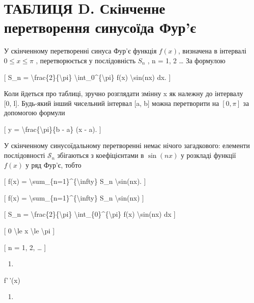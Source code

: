 \documentclass[
]{article}
\providecommand{\tightlist}{%
  \setlength{\itemsep}{0pt}\setlength{\parskip}{0pt}}
\begin{document}
\section{ТАБЛИЦЯ D. Скінченне перетворення синусоїда
Фур'є}\label{ux442ux430ux431ux43bux438ux446ux44f-d.-ux441ux43aux456ux43dux447ux435ux43dux43dux435-ux43fux435ux440ux435ux442ux432ux43eux440ux435ux43dux43dux44f-ux441ux438ux43dux443ux441ux43eux457ux434ux430-ux444ux443ux440ux454}

У скінченному перетворенні синуса Фур'є функція \(f(x)\), визначена в
інтервалі \(0 \le x \le \pi\) , перетворюється у послідовність \(S_n\) ,
n = 1, 2 \ldots{} За формулою

{[} S\_n = \textbackslash frac\{2\}\{\textbackslash pi\}
\textbackslash int\_0\^{}\{\textbackslash pi\} f(x)
\textbackslash sin(nx) dx. {]}

Коли йдеться про таблиці, зручно розглядати змінну x як належну до
інтервалу {[}0, l{]}. Будь-який інший чисельний інтервал {[}a, b{]}
можна перетворити на \([0, \pi]\) за допомогою формули

{[} y = \textbackslash frac\{\textbackslash pi\}\{b - a\} (x - a). {]}

У скінченному синусоїдальному перетворенні немає нічого загадкового:
елементи послідовності \(\mathcal{S}_n\) збігаються з коефіцієнтами в
\(\sin(nx)\) у розкладі функції \(f(x)\) у ряд Фур'є, тобто

{[} f(x) = \textbackslash sum\_\{n=1\}\^{}\{\textbackslash infty\} S\_n
\textbackslash sin(nx). {]}

{[} f(x) = \textbackslash sum\_\{n=1\}\^{}\{\textbackslash infty\} S\_n
\textbackslash sin(nx) {]}

{[} S\_n = \textbackslash frac\{2\}\{\textbackslash pi\}
\textbackslash int\_\{0\}\^{}\{\textbackslash pi\} f(x)
\textbackslash sin(nx) dx {]}

{[} 0 \textbackslash le x \textbackslash le \textbackslash pi {]}

{[} n = 1, 2, \ldots{} {]}

\begin{enumerate}
\def\labelenumi{\arabic{enumi}.}
\tightlist
\item
\end{enumerate}

f'\,'(x)

\begin{enumerate}
\def\labelenumi{\arabic{enumi}.}
\setcounter{enumi}{8}
\tightlist
\item
\end{enumerate}
\end{document}

